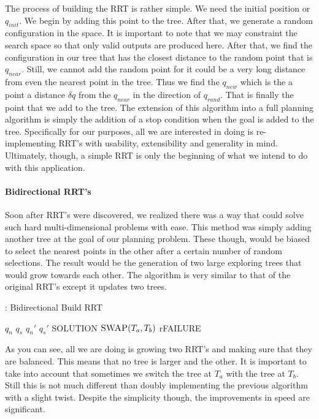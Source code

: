 \documentclass[titlepage]{article}
\begin{document}
The process of building the RRT is rather simple. We need the initial position or $q_{init}$. We begin by adding this point to the tree. After that, we generate a random configuration in the space. It is important to note that we may constraint the search space so that only valid outputs are produced here. After that, we find the configuration in our tree that has the closest distance to the random point that is $q_{near}$. Still, we cannot add the random point for it could be a very long distance from even the nearest point in the tree. Thus we find the $q_{new}$ which is the a point a distance $\delta q$ from the $q_{near}$ in the direction of $q_{rand}$. That is finally the point that we add to the tree. The extension of this algorithm into a full planning algorithm is simply the addition of a stop condition when the goal is added to the tree.
Specifically for our purposes, all we are interested in doing is re-implementing RRT's with usability, extensibility and generality in mind. Ultimately, though, a simple RRT is only the beginning of what we intend to do with this application.
\paragraph{Bidirectional RRT's}
Soon after RRT's were discovered, we realized there was a way that could solve such hard multi-dimensional problems with ease. This method was simply adding another tree at the goal of our planning problem. These though, would be biased to select the nearest points in the other after a certain number of random selections. The result would be the generation of two large exploring trees that would grow towards each other. The algorithm is very similar to that of the original RRT's except it updates two trees.
\begin{algorithm}
\caption{: Bidirectional Build RRT}
\begin{algorithmic}
\State $q_{n}$ \gets {}
\State $q_{s}$ \gets {}
\State {}
\State {}
\State $q_{n}'$ \gets {}
\State $q_{s}'$ \gets {}
\State {}
\State {}
\State \Return SOLUTION
\EndIf
{}
\State $\Call{SWAP}{T_{a},T_{b}}$
\EndIf
\EndIf
\EndIf
\EndFor
\State r\Return FAILURE
\EndFunction
\end{algorithmic}
\end{algorithm}
As you can see, all we are doing is growing two RRT's and making sure that they are balanced. This means that no tree is larger and the other. It is important to take into account that sometimes we switch the tree at $T_{a}$ with the tree at $T_{b}$. Still this is not much different than doubly implementing the previous algorithm with a slight twist. Despite the simplicity though, the improvements in speed are significant.
\end{document}
